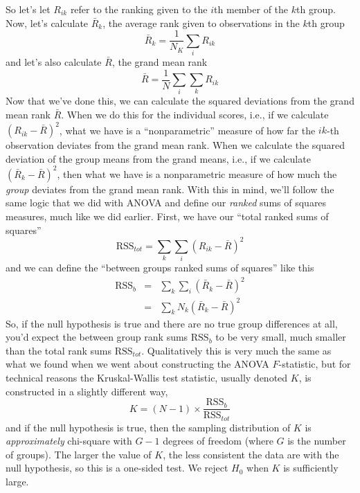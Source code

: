 \vspace{0.7cm}
\begin{mdframed}[style=MyFrame,nobreak=false]
So let's let $R_{ik}$ refer to the ranking given to the $i$th member of the $k$th group. Now, let's calculate $\bar{R}_k$, the average rank given to observations in the $k$th group
$$
\bar{R}_k = \frac{1}{N_K} \sum_{i} R_{ik}
$$
and let's also calculate $\bar{R}$, the grand mean rank
$$
\bar{R} = \frac{1}{N} \sum_{i} \sum_{k} R_{ik}
$$
Now that we've done this, we can calculate the squared deviations from the grand mean rank $\bar{R}$. When we do this for the individual scores, i.e., if we calculate $(R_{ik} - \bar{R})^2$, what we have is a ``nonparametric'' measure of how far the $ik$-th observation deviates from the grand mean rank. When we calculate the squared deviation of the group means from the grand means, i.e., if we calculate $(\bar{R}_k  - \bar{R} )^2$, then what we have is a nonparametric measure of how much the {\it group} deviates from the grand mean rank. With this in mind, we’ll follow the same logic that we did with ANOVA and define our {\it ranked} sums of squares measures, much like we did earlier. First, we have our ``total ranked sums of squares''
$$
\mbox{RSS}_{tot} = \sum_k \sum_i ( R_{ik} - \bar{R} )^2
$$
and we can define the ``between groups ranked sums of squares'' like this
$$
\begin{array}{rcl}
\mbox{RSS}_{b} &=& \sum_k \sum_i ( \bar{R}_k  - \bar{R} )^2 \\
&=& \sum_k N_k ( \bar{R}_k  - \bar{R} )^2 
\end{array}
$$
So, if the null hypothesis is true and there are no true group differences at all, you'd expect the between group rank sums $\mbox{RSS}_{b}$ to be very small, much smaller than the total rank sums $\mbox{RSS}_{tot}$. Qualitatively this is very much the same as what we found when we went about constructing the ANOVA $F$-statistic, but for technical reasons the Kruskal-Wallis test statistic, usually denoted $K$, is constructed in a slightly different way,
$$
K = (N - 1) \times \frac{\mbox{RSS}_b}{\mbox{RSS}_{tot}}
$$
and if the null hypothesis is true, then the sampling distribution of $K$ is {\it approximately} chi-square with $G-1$ degrees of freedom (where $G$ is the number of groups). The larger the value of $K$, the less consistent the data are with the null hypothesis, so this is a one-sided test. We reject $H_0$ when $K$ is sufficiently large.



\end{mdframed}
